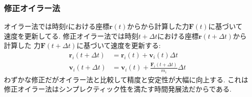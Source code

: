 \subsubsection{修正オイラー法}
オイラー法では時刻$t$における座標$\bm{r}(t)$からから計算した力$\bm{F}(t)$に基づいて
速度を更新してる.
修正オイラー法では時刻$t+\Delta t$における座標$\bm{r}(t + \Delta t)$から計算した
力$\bm{F}(t + \Delta t)$に基づいて速度を更新する:
\begin{align}
  \bm{r}_{i}(t + \Delta t)
&=\bm{r}_{i}(t)
 +\bm{v}_{i}(t) \Delta t
  \\
  \bm{v}_{i}(t + \Delta t)
&=\bm{v}_{i}(t)
 +\frac{\bm{F}_{i}(t+\Delta t)}{m_{i}}\Delta t
\end{align}
わずかな修正だがオイラー法と比較して精度と安定性が大幅に向上する.
これは修正オイラー法はシンプレクティック性を満たす時間発展法だからである.

